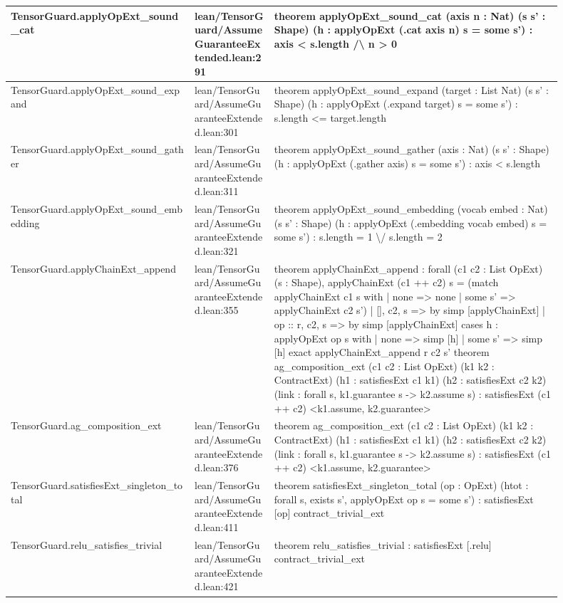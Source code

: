 \documentclass[10pt]{article}
\begin{document}
\begin{longtable}{|p{0.30\linewidth}|p{0.13\linewidth}|p{0.47\linewidth}|}
\hline
TensorGuard.applyOpExt\_sound\_cat & lean/TensorGuard/AssumeGuaranteeExtended.lean:291 & theorem applyOpExt\_sound\_cat (axis n : Nat) (s s' : Shape) (h : applyOpExt (.cat axis n) s = some s') : axis < s.length /\textbackslash{} n > 0 \\
\hline
TensorGuard.applyOpExt\_sound\_expand & lean/TensorGuard/AssumeGuaranteeExtended.lean:301 & theorem applyOpExt\_sound\_expand (target : List Nat) (s s' : Shape) (h : applyOpExt (.expand target) s = some s') : s.length <= target.length \\
\hline
TensorGuard.applyOpExt\_sound\_gather & lean/TensorGuard/AssumeGuaranteeExtended.lean:311 & theorem applyOpExt\_sound\_gather (axis : Nat) (s s' : Shape) (h : applyOpExt (.gather axis) s = some s') : axis < s.length \\
\hline
TensorGuard.applyOpExt\_sound\_embedding & lean/TensorGuard/AssumeGuaranteeExtended.lean:321 & theorem applyOpExt\_sound\_embedding (vocab embed : Nat) (s s' : Shape) (h : applyOpExt (.embedding vocab embed) s = some s') : s.length = 1 \textbackslash{}/ s.length = 2 \\
\hline
TensorGuard.applyChainExt\_append & lean/TensorGuard/AssumeGuaranteeExtended.lean:355 & theorem applyChainExt\_append : forall (c1 c2 : List OpExt) (s : Shape), applyChainExt (c1 ++ c2) s = (match applyChainExt c1 s with | none => none | some s' => applyChainExt c2 s') | [], c2, s => by simp [applyChainExt] | op :: r, c2, s => by simp [applyChainExt] cases h : applyOpExt op s with | none => simp [h] | some s' => simp [h] exact applyChainExt\_append r c2 s' theorem ag\_composition\_ext (c1 c2 : List OpExt) (k1 k2 : ContractExt) (h1 : satisfiesExt c1 k1) (h2 : satisfiesExt c2 k2) (link : forall s, k1.guarantee s -> k2.assume s) : satisfiesExt (c1 ++ c2) <k1.assume, k2.guarantee> \\
\hline
TensorGuard.ag\_composition\_ext & lean/TensorGuard/AssumeGuaranteeExtended.lean:376 & theorem ag\_composition\_ext (c1 c2 : List OpExt) (k1 k2 : ContractExt) (h1 : satisfiesExt c1 k1) (h2 : satisfiesExt c2 k2) (link : forall s, k1.guarantee s -> k2.assume s) : satisfiesExt (c1 ++ c2) <k1.assume, k2.guarantee> \\
\hline
TensorGuard.satisfiesExt\_singleton\_total & lean/TensorGuard/AssumeGuaranteeExtended.lean:411 & theorem satisfiesExt\_singleton\_total (op : OpExt) (htot : forall s, exists s', applyOpExt op s = some s') : satisfiesExt [op] contract\_trivial\_ext \\
\hline
TensorGuard.relu\_satisfies\_trivial & lean/TensorGuard/AssumeGuaranteeExtended.lean:421 & theorem relu\_satisfies\_trivial : satisfiesExt [.relu] contract\_trivial\_ext \\

\end{longtable}
\end{document}
